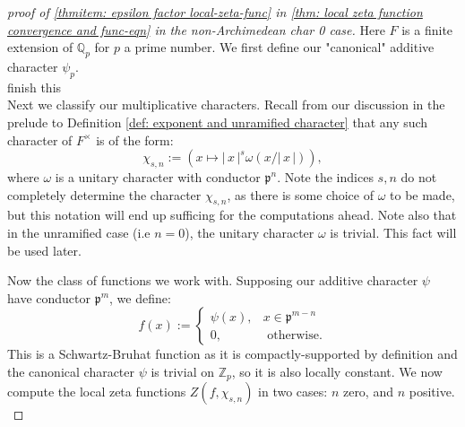 \documentclass[11pt, x11names]{book}
\newcommand{\zz}{\mathbb{Z}}
\newcommand{\qq}{\mathbb{Q}}
\newcommand{\pp}{\mathfrak{p}}
\renewcommand{\brack}[1]{\left(   #1 \right)}
\newcommand{\abs}[1]{\left| \, #1  \,\right|}
\begin{document}
\begin{proof}[proof of \ref{thmitem: epsilon factor local-zeta-func} in \ref{thm: local zeta function convergence and func-eqn} in the non-Archimedean char 0 case]
Here $F$ is a finite extension of $\qq_p$ for $p$ a prime number. We first define our "canonical" additive character $\psi_p$.\\
 finish this\\

Next we classify our multiplicative characters. Recall from our discussion in the prelude to Definition \ref{def: exponent and unramified character} that any such character of $F^\times$ is of the form:
\begin{equation*}
    \chi_{s, n} := \brack{x \mapsto \abs{x}^s \omega(x/\abs{x})},
\end{equation*}
where $\omega$ is a unitary character with conductor $\pp^n$. Note the indices $s, n$ do not completely determine the character $\chi_{s, n}$, as there is some choice of $\omega$ to be made, but this notation will end up sufficing for the computations ahead. Note also that in the unramified case (i.e $n=0$), the unitary character $\omega$ is trivial. This fact will be used later.

Now the class of functions we work with. Supposing our additive character $\psi$ have conductor $\pp^m$, we define:
\begin{equation*}
    f(x) := \begin{cases}
        \psi(x), & x \in \pp^{m-n}\\
        0, & \text{ otherwise}.
    \end{cases}
\end{equation*}
This is a Schwartz-Bruhat function as it is compactly-supported by definition and the canonical character $\psi$ is trivial on $\zz_p$, so it is also locally constant. We now compute the local zeta functions $Z(f, \chi_{s, n})$ in two cases: $n$ zero, and $n$ positive.\\


\end{proof}
\end{document}

